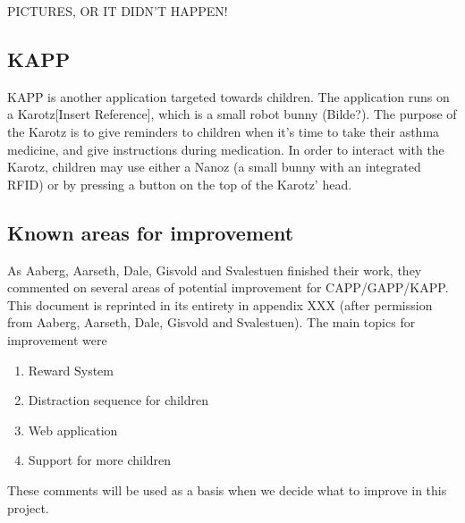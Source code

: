 PICTURES, OR IT DIDN'T HAPPEN!


\subsection{KAPP}
KAPP is another application targeted towards children. The application runs on a Karotz[Insert Reference], which is a small robot bunny (Bilde?). The purpose of the Karotz is to give reminders to children when it's time to take their asthma medicine, and give instructions during medication. In order to interact with the Karotz, children may use either a Nanoz (a small bunny with an integrated RFID) or by pressing a button on the top of the Karotz' head.    

\subsection{Known areas for improvement}
\label{sec:improvements}
As Aaberg, Aarseth, Dale, Gisvold and Svalestuen finished their work, they commented on several areas of potential improvement for CAPP/GAPP/KAPP. This document is reprinted in its entirety in appendix XXX (after permission from Aaberg, Aarseth, Dale, Gisvold and Svalestuen). The main topics for improvement were
\begin{enumerate}
\item{Reward System}
\item{Distraction sequence for children}
\item{Web application}
\item{Support for more children}
\end{enumerate}

These comments will be used as a basis when we decide what to improve in this project.




